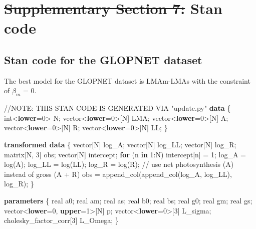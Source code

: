 \documentclass[
  12pt,
  letterpaper,
  DIV=11,
  numbers=noendperiod]{scrartcl}
\newenvironment{Shaded}{\begin{snugshade}}{\end{snugshade}}
\newcommand{\AlertTok}[1]{\textcolor[rgb]{0.68,0.00,0.00}{#1}}
\newcommand{\CommentTok}[1]{\textcolor[rgb]{0.37,0.37,0.37}{#1}}
\newcommand{\ControlFlowTok}[1]{\textcolor[rgb]{0.00,0.23,0.31}{\textbf{#1}}}
\newcommand{\DataTypeTok}[1]{\textcolor[rgb]{0.68,0.00,0.00}{#1}}
\newcommand{\DecValTok}[1]{\textcolor[rgb]{0.68,0.00,0.00}{#1}}
\newcommand{\KeywordTok}[1]{\textcolor[rgb]{0.00,0.23,0.31}{\textbf{#1}}}
\newcommand{\NormalTok}[1]{\textcolor[rgb]{0.00,0.23,0.31}{#1}}
\numberwithin{equation}{section} %
\providecommand{\DIFdel}[1]{{\protect\color{red}\sout{#1}}}                      %
\providecommand{\DIFaddbegin}{} %
\providecommand{\DIFaddend}{} %
\providecommand{\DIFdelbegin}{} %
\providecommand{\DIFdelend}{} %
\newcommand{\DIFscaledelfig}{0.5}
\newlength{\DIFdelgraphicswidth} %
\newlength{\DIFdelgraphicsheight} %
\newcommand{\DIFaddincludegraphics}[2][]{{\color{blue}\fbox{\DIFOincludegraphics[#1]{#2}}}} %
\newcommand{\DIFdelincludegraphics}[2][]{%
\sbox{\DIFdelgraphicsbox}{\DIFOincludegraphics[#1]{#2}}%
\settoboxwidth{\DIFdelgraphicswidth}{\DIFdelgraphicsbox} %
\settoboxtotalheight{\DIFdelgraphicsheight}{\DIFdelgraphicsbox} %
\scalebox{\DIFscaledelfig}{%
\parbox[b]{\DIFdelgraphicswidth}{\usebox{\DIFdelgraphicsbox}\\[-\baselineskip] \rule{\DIFdelgraphicswidth}{0em}}\llap{\resizebox{\DIFdelgraphicswidth}{\DIFdelgraphicsheight}{%
\setlength{\unitlength}{\DIFdelgraphicswidth}%
\begin{picture}(1,1)%
\thicklines\linethickness{2pt} %
{\color[rgb]{1,0,0}\put(0,0){\framebox(1,1){}}}%
{\color[rgb]{1,0,0}\put(0,0){\line( 1,1){1}}}%
{\color[rgb]{1,0,0}\put(0,1){\line(1,-1){1}}}%
\end{picture}%
}\hspace*{3pt}}} %
} %
\DeclareRobustCommand{\DIFaddbegin}{\DIFOaddbegin \let\includegraphics\DIFaddincludegraphics} %
\DeclareRobustCommand{\DIFaddend}{\DIFOaddend \let\includegraphics\DIFOincludegraphics} %
\DeclareRobustCommand{\DIFdelbegin}{\DIFOdelbegin \let\includegraphics\DIFdelincludegraphics} %
\DeclareRobustCommand{\DIFdelend}{\DIFOaddend \let\includegraphics\DIFOincludegraphics} %
\begin{document}
\section{\DIFdelbegin \DIFdel{Supplementary Section 7: }\DIFdelend Stan code}\DIFdelbegin %
\DIFdelend \DIFaddbegin \label{stan-code}
\DIFaddend 

\subsection{Stan code for the GLOPNET
dataset}\label{stan-code-for-the-glopnet-dataset}

The best model for the GLOPNET dataset is LMAm-LMAs with the constraint
of \(\beta_m\) = 0.

\begin{Shaded}
\begin{Highlighting}[]
\CommentTok{//}\AlertTok{NOTE}\CommentTok{: THIS STAN CODE IS GENERATED VIA "update.py"}
\KeywordTok{data}\NormalTok{ \{}
  \DataTypeTok{int}\NormalTok{\textless{}}\KeywordTok{lower}\NormalTok{=}\DecValTok{0}\NormalTok{\textgreater{} N;}
  \DataTypeTok{vector}\NormalTok{\textless{}}\KeywordTok{lower}\NormalTok{=}\DecValTok{0}\NormalTok{\textgreater{}[N] LMA;}
  \DataTypeTok{vector}\NormalTok{\textless{}}\KeywordTok{lower}\NormalTok{=}\DecValTok{0}\NormalTok{\textgreater{}[N] A;}
  \DataTypeTok{vector}\NormalTok{\textless{}}\KeywordTok{lower}\NormalTok{=}\DecValTok{0}\NormalTok{\textgreater{}[N] R;}
  \DataTypeTok{vector}\NormalTok{\textless{}}\KeywordTok{lower}\NormalTok{=}\DecValTok{0}\NormalTok{\textgreater{}[N] LL;}
\NormalTok{\}}

\KeywordTok{transformed data}\NormalTok{ \{}
  \DataTypeTok{vector}\NormalTok{[N] log\_A;}
  \DataTypeTok{vector}\NormalTok{[N] log\_LL;}
  \DataTypeTok{vector}\NormalTok{[N] log\_R;}
  \DataTypeTok{matrix}\NormalTok{[N, }\DecValTok{3}\NormalTok{] obs;}
  \DataTypeTok{vector}\NormalTok{[N] intercept;}
  \ControlFlowTok{for}\NormalTok{ (n }\ControlFlowTok{in} \DecValTok{1}\NormalTok{:N)}
\NormalTok{    intercept[n] = }\DecValTok{1}\NormalTok{;}
\NormalTok{  log\_A = log(A);}
\NormalTok{  log\_LL = log(LL);}
\NormalTok{  log\_R = log(R);}
  \CommentTok{// use net photosynthesis (A) instead of gross (A + R)}
\NormalTok{  obs = append\_col(append\_col(log\_A, log\_LL), log\_R);}
\NormalTok{\}}

\KeywordTok{parameters}\NormalTok{ \{}
  \DataTypeTok{real}\NormalTok{ a0;}
  \DataTypeTok{real}\NormalTok{ am;}
  \DataTypeTok{real}\NormalTok{ as;}
  \DataTypeTok{real}\NormalTok{ b0;}
  \DataTypeTok{real}\NormalTok{ bs;}
  \DataTypeTok{real}\NormalTok{ g0;}
  \DataTypeTok{real}\NormalTok{ gm;}
  \DataTypeTok{real}\NormalTok{ gs;}
  \DataTypeTok{vector}\NormalTok{\textless{}}\KeywordTok{lower}\NormalTok{=}\DecValTok{0}\NormalTok{, }\KeywordTok{upper}\NormalTok{=}\DecValTok{1}\NormalTok{\textgreater{}[N] p;}
  \DataTypeTok{vector}\NormalTok{\textless{}}\KeywordTok{lower}\NormalTok{=}\DecValTok{0}\NormalTok{\textgreater{}[}\DecValTok{3}\NormalTok{] L\_sigma;}
  \DataTypeTok{cholesky\_factor\_corr}\NormalTok{[}\DecValTok{3}\NormalTok{] L\_Omega;}
\NormalTok{\}}


\end{Highlighting}
\end{Shaded}
\end{document}
